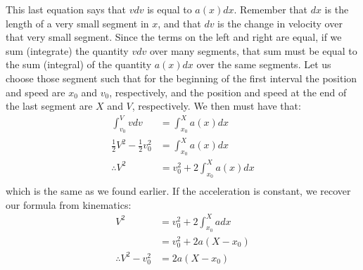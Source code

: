 This last equation says that $vdv$ is equal to $a(x)dx$. Remember that $dx$ is the length of a very small segment in $x$, and that $dv$ is the change in velocity over that very small segment. Since the terms on the left and right are equal, if we sum (integrate) the quantity $vdv$ over many segments, that sum must be equal to the sum (integral) of the quantity $a(x)dx$ over the same segments. Let us choose those segment such that for the beginning of the first interval the position and speed are $x_0$ and $v_0$, respectively, and the position and speed at the end of the last segment are $X$ and $V$, respectively. We then must have that:
\begin{align*}
\int_{v_0}^{V}vdv&=\int_{x_0}^{X}a(x)dx\\
 \frac{1}{2}V^2 - \frac{1}{2}v_0^2 &= \int_{x_0}^{X}a(x)dx\\
\therefore V^2 &= v_0^2 + 2\int_{x_0}^{X}a(x)dx\\
\end{align*}
which is the same as we found earlier. If the acceleration is constant, we recover our formula from kinematics:
\begin{align*}
V^2 &= v_0^2+ 2\int_{x_0}^{X}adx\\
&=v_0^2+ 2a(X-x_0)\\
\therefore V^2- v_0^2 &= 2a(X-x_0)
\end{align*}

